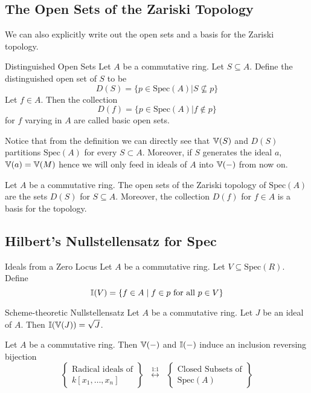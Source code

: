 \documentclass[a4paper]{article}
\begin{document}
\subsection{The Open Sets of the Zariski Topology}
We can also explicitly write out the open sets and a basis for the Zariski topology. 

\begin{defn}{Distinguished Open Sets}{} Let $A$ be a commutative ring. Let $S\subseteq A$. Define the distinguished open set of $S$ to be $$D(S)=\{p\in\text{Spec}(A)|S\not\subseteq p\}$$ Let $f\in A$. Then the collection $$D(f)=\{p\in\text{Spec}(A)|f\notin p\}$$ for $f$ varying in $A$ are called basic open sets. 
\end{defn}

Notice that from the definition we can directly see that $\mathbb{V}(S)$ and $D(S)$ partitions $\text{Spec}(A)$ for every $S\subset A$. Moreover, if $S$ generates the ideal $a$, $\mathbb{V}(a)=\mathbb{V}(M)$ hence we will only feed in ideals of $A$ into $\mathbb{V}(-)$ from now on. 

\begin{thm}{}{} Let $A$ be a commutative ring. The open sets of the Zariski topology of $\text{Spec}(A)$ are the sets $D(S)$ for $S\subseteq A$. Moreover, the collection $D(f)$ for $f\in A$ is a basis for the topology. 
\end{thm}

\subsection{Hilbert's Nullstellensatz for Spec}
\begin{defn}{Ideals from a Zero Locus}{} Let $A$ be a commutative ring. Let $V\subseteq\text{Spec}(R)$. Define $$\mathbb{I}(V)=\{f\in A\;|\;f\in p\text{ for all }p\in V\}$$
\end{defn}

\begin{thm}{Scheme-theoretic Nullstellensatz}{} Let $A$ be a commutative ring. Let $J$ be an ideal of $A$. Then $\mathbb{I}(\mathbb{V}(J))=\sqrt{J}$. 
\end{thm}

\begin{crl}{}{} Let $A$ be a commutative ring. Then $\mathbb{V}(-)$ and $\mathbb{I}(-)$ induce an inclusion reversing bijection $$\left\{\substack{\text{Radical ideals of}\\ k[x_1,\dots,x_n]}\right\}\;\;\overset{\text{1:1}}{\longleftrightarrow}\;\;\left\{\substack{\text{Closed Subsets of}\\\text{Spec}(A)}\right\}$$
\end{crl}
\end{document}
